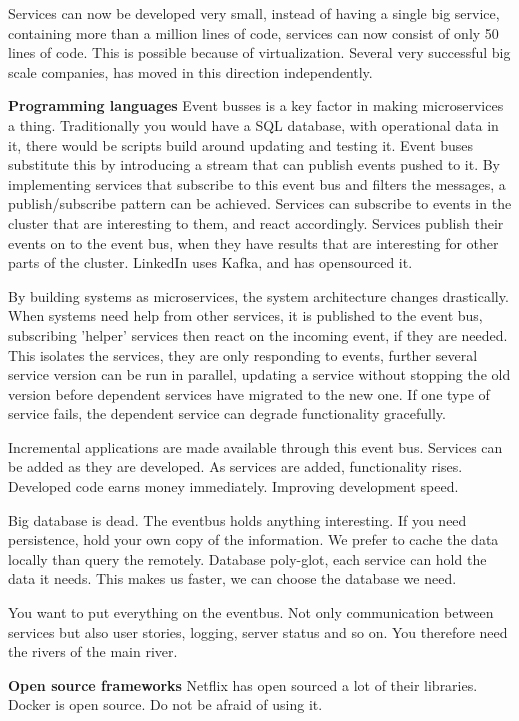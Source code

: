 {Services can now be developed very small, instead of having a single big service, containing more than a million lines of code, services can now consist of only 50 lines of code. This is possible because of virtualization. Several very successful big scale companies, has moved in this direction independently.

\textbf{Programming languages}
Event busses is a key factor in making microservices a thing. Traditionally you would have a SQL database, with operational data in it, there would be scripts build around updating and testing it.
Event buses substitute this by introducing a stream that can publish events pushed to it. By implementing services that subscribe to this event bus and filters the messages, a publish/subscribe pattern can be achieved. Services can subscribe to events in the cluster that are interesting to them, and react accordingly. Services publish their events on to the event bus, when they have results that are interesting for other parts of the cluster.
LinkedIn uses Kafka, and has opensourced it.

By building systems as microservices, the system architecture changes drastically. When systems need help from other services, it is published to the event bus, subscribing 'helper' services then react on the incoming event, if they are needed. This isolates the services, they are only responding to events, further several service version can be run in parallel, updating a service without stopping the old version before dependent services have migrated to the new one. If one type of service fails, the dependent service can degrade functionality gracefully.

Incremental applications are made available through this event bus. Services can be added as they are developed. As services are added, functionality rises. Developed code earns money immediately. Improving development speed.

Big database is dead. The eventbus holds anything interesting. If you need persistence, hold your own copy of the information. We prefer to cache the data locally than query the remotely. Database poly-glot, each service can hold the data it needs. This makes us faster, we can choose the database we need.

You want to put everything on the eventbus. Not only communication between services but also user stories, logging, server status and so on. You therefore need the rivers of the main river.

\textbf{Open source frameworks}
Netflix has open sourced a lot of their libraries. Docker is open source. Do not be afraid of using it.

}
